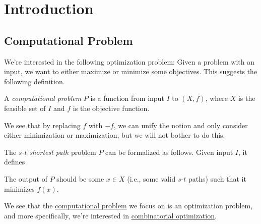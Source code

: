 \chapter{Introduction}

\section{Computational Problem}


We're interested in the following optimization problem: Given a problem with an input, we want to either maximize or minimize some objectives. This suggests the following definition.

\begin{definition}\label{def:computational-problem}
	A \emph{computational problem} \(P\) is a function from input \(I\) to \((X, f)\), where \(X\) is the feasible set of \(I\) and \(f\) is the objective function.
\end{definition}

We see that by replacing \(f\) with \(-f\), we can unify the notion and only consider either minimization or maximization, but we will not bother to do this.

\begin{eg}\label{eg:s-t-path}
	The \emph{\(s\)-\(t\) shortest path} problem \(P\) can be formalized as follows. Given input \(I\), it defines
	The output of \(P\) should be some \(x\in X\) (i.e., some valid \(s\)-\(t\) paths) such that it minimizes \(f(x)\).
\end{eg}

We see that the \hyperref[def:computational-problem]{computational problem} we focus on is an optimization problem, and more specifically, we're interested in \hyperref[def:combinatorial-optimization]{combinatorial optimization}.

